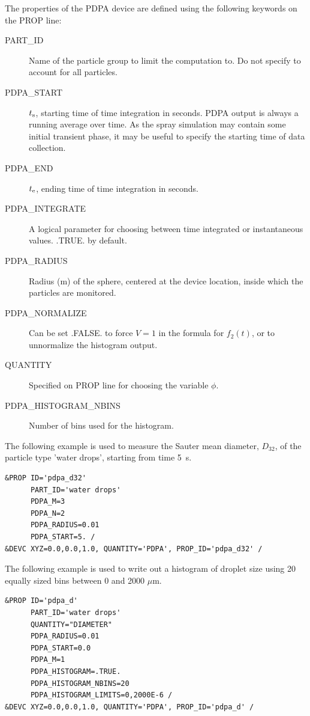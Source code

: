 \documentclass[11pt]{book}
\begin{document}
The properties of the PDPA device are defined using the following keywords on the {\ct PROP} line:
\begin{description}
\item[{\ct PART\_ID}] Name of the particle group to limit the computation to. Do not specify to account for all particles.
\item[{\ct PDPA\_START}] $t_{\rm s}$, starting time of time integration in seconds. PDPA output is always a running average over time. As the spray simulation may contain some initial transient phase, it may be useful to specify the starting time of data collection.
\item[{\ct PDPA\_END}] $t_{\rm e}$, ending time of time integration in seconds.
\item[{\ct PDPA\_INTEGRATE}] A logical parameter for choosing between time integrated or instantaneous values. {\ct .TRUE.} by default.
\item[{\ct PDPA\_RADIUS}] Radius (m) of the sphere, centered at the device location, inside which the particles are monitored.
\item[{\ct PDPA\_NORMALIZE}] Can be set {\ct .FALSE.} to force $V = 1$ in the formula for $f_2(t)$, or to unnormalize the histogram output.
\item[{\ct QUANTITY}] Specified on {\ct PROP} line for choosing the variable $\phi$.
\item[{\ct PDPA\_HISTOGRAM\_NBINS}] Number of bins used for the histogram.
\end{description}
The following example is used to measure the Sauter mean diameter, $D_{32}$, of the particle type {\ct 'water drops'}, starting from time 5~s.
\begin{lstlisting}
&PROP ID='pdpa_d32'
      PART_ID='water drops'
      PDPA_M=3
      PDPA_N=2
      PDPA_RADIUS=0.01
      PDPA_START=5. /
&DEVC XYZ=0.0,0.0,1.0, QUANTITY='PDPA', PROP_ID='pdpa_d32' /
\end{lstlisting}
The following example is used to write out a histogram of droplet size using 20 equally sized bins between 0 and 2000 $\mu$m.
\begin{lstlisting}
&PROP ID='pdpa_d'
      PART_ID='water drops'
      QUANTITY="DIAMETER"
      PDPA_RADIUS=0.01
      PDPA_START=0.0
      PDPA_M=1
      PDPA_HISTOGRAM=.TRUE.
      PDPA_HISTOGRAM_NBINS=20
      PDPA_HISTOGRAM_LIMITS=0,2000E-6 /
&DEVC XYZ=0.0,0.0,1.0, QUANTITY='PDPA', PROP_ID='pdpa_d' /
\end{lstlisting}
\end{document}
